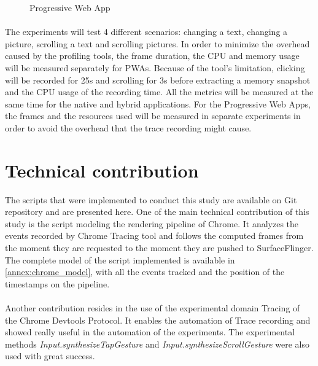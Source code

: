 \documentclass{kththesis}
\begin{document}
\begin{figure}
    \centering
    \hfill
    \hfill
    \hfill
    \hfill
    \caption{Progressive Web App}
    \label{fig:pwa_screens}
\end{figure}

\paragraph{}
The experiments will test 4 different scenarios: changing a text, changing a picture, scrolling a text and scrolling pictures. In order to minimize the overhead caused by the profiling tools, the frame duration, the CPU and memory usage will be measured separately for PWAs.  \newline
Because of the tool's limitation, clicking will be recorded for 25s and scrolling for 3s before extracting a memory snapshot and the CPU usage of the recording time. All the metrics will be measured at the same time for the native and hybrid applications. For the Progressive Web Apps, the frames and the resources used will be measured in separate experiments in order to avoid the overhead that the trace recording might cause.

\section{Technical contribution}

The scripts that were implemented to conduct this study are available on Git repository and are presented here. One of the main technical contribution of this study is the script modeling the rendering pipeline of Chrome. It analyzes the events recorded by Chrome Tracing tool and follows the computed frames from the moment they are requested to the moment they are pushed to SurfaceFlinger. The complete model of the script implemented is available in \autoref{annex:chrome_model}, with all the events tracked and the position of the timestamps on the pipeline.
\paragraph{}
Another contribution resides in the use of the experimental domain Tracing of the Chrome Devtools Protocol. It enables the automation of Trace recording and showed really useful in the automation of the experiments. The experimental methods \textit{Input.synthesizeTapGesture} and \textit{Input.synthesizeScrollGesture} were also used with great success.
\end{document}
